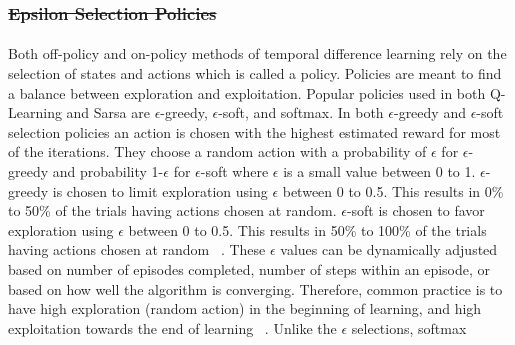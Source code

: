 \documentclass[12pt,american]{report}
\providecommand{\DIFaddtex}[1]{{\protect\color{blue}\uwave{#1}}} %
\providecommand{\DIFdeltex}[1]{{\protect\color{red}\sout{#1}}}                      %
\providecommand{\DIFaddbegin}{} %
\providecommand{\DIFaddend}{} %
\providecommand{\DIFdelbegin}{} %
\providecommand{\DIFdelend}{} %
\providecommand{\DIFadd}[1]{\texorpdfstring{\DIFaddtex{#1}}{#1}} %
\providecommand{\DIFdel}[1]{\texorpdfstring{\DIFdeltex{#1}}{}} %
\newcommand{\DIFscaledelfig}{0.5}
\newlength{\DIFdelgraphicswidth} %
\newlength{\DIFdelgraphicsheight} %
\newcommand{\DIFaddincludegraphics}[2][]{{\color{blue}\fbox{\DIFOincludegraphics[#1]{#2}}}} %
\newcommand{\DIFdelincludegraphics}[2][]{%
\sbox{\DIFdelgraphicsbox}{\DIFOincludegraphics[#1]{#2}}%
\settoboxwidth{\DIFdelgraphicswidth}{\DIFdelgraphicsbox} %
\settoboxtotalheight{\DIFdelgraphicsheight}{\DIFdelgraphicsbox} %
\scalebox{\DIFscaledelfig}{%
\parbox[b]{\DIFdelgraphicswidth}{\usebox{\DIFdelgraphicsbox}\\[-\baselineskip] \rule{\DIFdelgraphicswidth}{0em}}\llap{\resizebox{\DIFdelgraphicswidth}{\DIFdelgraphicsheight}{%
\setlength{\unitlength}{\DIFdelgraphicswidth}%
\begin{picture}(1,1)%
\thicklines\linethickness{2pt} %
{\color[rgb]{1,0,0}\put(0,0){\framebox(1,1){}}}%
{\color[rgb]{1,0,0}\put(0,0){\line( 1,1){1}}}%
{\color[rgb]{1,0,0}\put(0,1){\line(1,-1){1}}}%
\end{picture}%
}\hspace*{3pt}}} %
} %
\DeclareRobustCommand{\DIFaddbegin}{\DIFOaddbegin \let\includegraphics\DIFaddincludegraphics} %
\DeclareRobustCommand{\DIFaddend}{\DIFOaddend \let\includegraphics\DIFOincludegraphics} %
\DeclareRobustCommand{\DIFdelbegin}{\DIFOdelbegin \let\includegraphics\DIFdelincludegraphics} %
\DeclareRobustCommand{\DIFdelend}{\DIFOaddend \let\includegraphics\DIFOincludegraphics} %
\begin{document}
        \DIFdelbegin \subsubsection{\DIFdel{Epsilon Selection Policies}}
\addtocounter{subsubsection}{-1}%
\DIFdelend \DIFaddbegin \paragraph{\DIFadd{Epsilon Selection Policies}}
        \DIFaddend Both off-policy and on-policy methods of temporal difference learning rely on the selection of states and actions which is called a policy.  Policies are meant to find a balance between exploration and exploitation. Popular policies used in both Q-Learning and Sarsa are \begin{math}\epsilon\end{math}-greedy, \begin{math}\epsilon\end{math}-soft, and softmax.  In both \begin{math}\epsilon\end{math}-greedy and \begin{math}\epsilon\end{math}-soft selection policies an action is chosen with the highest estimated reward for most of the iterations. They choose a random action with a probability of \begin{math}\epsilon\end{math} for \begin{math}\epsilon\end{math}-greedy and probability 1-\begin{math}\epsilon\end{math} for \begin{math}\epsilon\end{math}-soft where \begin{math}\epsilon\end{math} is a small value between 0 to 1. \begin{math}\epsilon\end{math}-greedy is chosen to limit exploration using \begin{math}\epsilon\end{math} between 0 to 0.5. This results in 0\% to 50\% of the trials having actions chosen at random.  \begin{math}\epsilon\end{math}-soft is chosen to favor exploration using \begin{math}\epsilon\end{math} between 0 to 0.5. This results in 50\% to 100\% of the trials having actions chosen at random ~\cite{Eden}. These $\epsilon$ values can be dynamically adjusted based on number of episodes completed, number of steps within an episode, or based on how well the algorithm is converging.  Therefore, common practice is to have high exploration (random action) in the beginning of learning, and high exploitation towards the end of learning ~\cite{Greedy}.  Unlike the \begin{math}\epsilon\end{math} selections, softmax 
\end{document}
